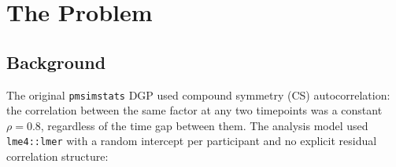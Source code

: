 \documentclass[11pt]{article}
\begin{document}
\maketitle
\thispagestyle{fancy}

\begin{abstract}
When the \texttt{pmsimstats} data-generating process was
updated from compound symmetry to AR(1) within-factor
autocorrelation to expand the feasible parameter space, the
analysis model's assumption of independent residuals (given
a random intercept) became misspecified. This misspecification
inflated Type~I error rates for the OL and CO designs from the
nominal 5\% to 13--17\%. This paper documents the problem,
derives the appropriate analysis model, and validates the fix
by switching from \texttt{lme4::lmer} to \texttt{nlme::lme}
with a continuous-time AR(1) residual correlation structure
(\texttt{corCAR1}).
\end{abstract}

\bigskip
\noindent{}
\bigskip

\tableofcontents
\newpage

\section{The Problem}

\subsection{Background}

The original \texttt{pmsimstats} DGP used compound symmetry
(CS) autocorrelation: the correlation between the same factor
at any two timepoints was a constant $\rho = 0.8$, regardless
of the time gap between them. The analysis model used
\texttt{lme4::lmer} with a random intercept per participant
and no explicit residual correlation structure:
\end{document}
